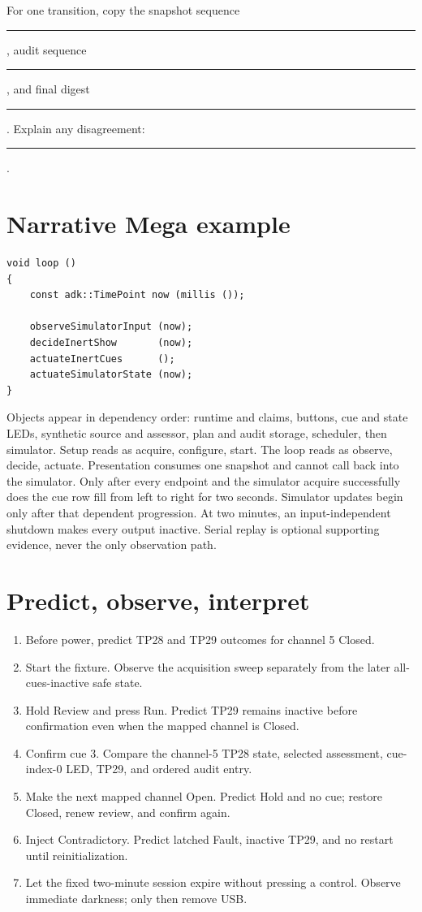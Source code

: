 \documentclass[11pt]{article}
\newcommand{\blank}[1]{\rule{#1}{0.4pt}}
\begin{document}
For one transition, copy the snapshot sequence \blank{1.0in}, audit sequence
\blank{1.0in}, and final digest \blank{1.1in}. Explain any disagreement:
\blank{2.5in}.

\section{Narrative Mega example}

\begin{lstlisting}[style=adkcpp]
void loop ()
{
    const adk::TimePoint now (millis ());

    observeSimulatorInput (now);
    decideInertShow       (now);
    actuateInertCues      ();
    actuateSimulatorState (now);
}
\end{lstlisting}

Objects appear in dependency order: runtime and claims, buttons, cue and state
LEDs, synthetic source and assessor, plan and audit storage, scheduler, then
simulator. Setup reads as acquire, configure, start. The loop reads as observe,
decide, actuate. Presentation consumes one snapshot and cannot call back into
the simulator. Only after every endpoint and the simulator acquire
successfully does the cue row fill from left to right for two seconds.
Simulator updates begin only after that dependent progression. At two minutes,
an input-independent shutdown makes every output inactive. Serial replay is
optional supporting evidence, never the only observation path.

\section{Predict, observe, interpret}

\begin{enumerate}
  \item Before power, predict TP28 and TP29 outcomes for channel 5 Closed.
  \item Start the fixture. Observe the acquisition sweep separately from the
        later all-cues-inactive safe state.
  \item Hold Review and press Run. Predict TP29 remains inactive before
        confirmation even when the mapped channel is Closed.
  \item Confirm cue 3. Compare the channel-5 TP28 state, selected assessment,
        cue-index-0 LED, TP29, and ordered audit entry.
  \item Make the next mapped channel Open. Predict Hold and no cue; restore
        Closed, renew review, and confirm again.
  \item Inject Contradictory. Predict latched Fault, inactive TP29, and no
        restart until reinitialization.
  \item Let the fixed two-minute session expire without pressing a control.
        Observe immediate darkness; only then remove USB.
\end{enumerate}
\end{document}
